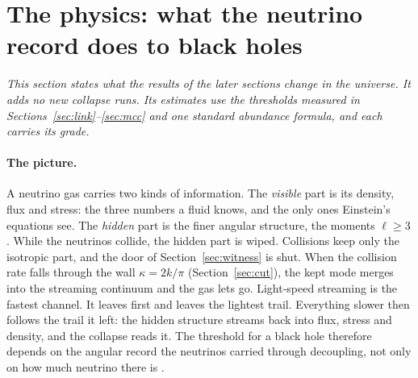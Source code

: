 \section{The physics: what the neutrino record does to black holes}\label{sec:physics}

\noindent\emph{This section states what the results of the later sections change in the universe. It adds no new collapse runs. Its estimates use the thresholds measured in Sections~\ref{sec:link}--\ref{sec:mcc} and one standard abundance formula, and each carries its grade.}

\paragraph{The picture.} A neutrino gas carries two kinds of information. The \emph{visible} part is its density, flux and stress: the three numbers a fluid knows, and the only ones Einstein's equations see. The \emph{hidden} part is the finer angular structure, the moments $\ell\ge3$. While the neutrinos collide, the hidden part is wiped. Collisions keep only the isotropic part, and the door of Section~\ref{sec:witness} is shut. When the collision rate falls through the wall $\kappa=2k/\pi$ (Section~\ref{sec:cut}), the kept mode merges into the streaming continuum and the gas lets go. Light-speed streaming is the fastest channel. It leaves first and leaves the lightest trail. Everything slower then follows the trail it left: the hidden structure streams back into flux, stress and density, and the collapse reads it. The threshold for a black hole therefore depends on the angular record the neutrinos carried through decoupling, not only on how much neutrino there is .

